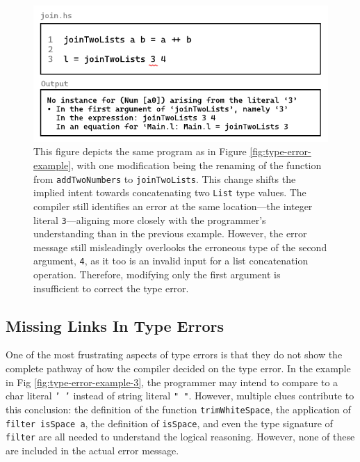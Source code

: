 \begin{figure}[hbt]
  \includegraphics[width=\linewidth]{TypeErrorExample2}
  \caption{
    \label{fig:type-error-example-2}
    This figure depicts the same program as in Figure \ref{fig:type-error-example}, with one modification being the renaming of the function from \texttt{addTwoNumbers} to \texttt{joinTwoLists}. This change shifts the implied intent towards concatenating two \texttt{List} type values. The compiler still identifies an error at the same location—the integer literal \texttt{3}—aligning more closely with the programmer's understanding than in the previous example. However, the error message still misleadingly overlooks the erroneous type of the second argument, \texttt{4}, as it too is an invalid input for a list concatenation operation. Therefore, modifying only the first argument is insufficient to correct the type error.
    }
\end{figure}

\subsection{Missing Links In Type Errors}
\label{subsec:missing-link}

One of the most frustrating aspects of type errors is that they do not show the complete pathway of how the compiler decided on the type error. In the example in Fig \ref{fig:type-error-example-3}, the programmer may intend to compare to a char literal \texttt{' '} instead of string literal \texttt{" "}. However, multiple clues contribute to this conclusion: the definition of the function \texttt{trimWhiteSpace}, the application of \texttt{filter isSpace a}, the definition of \texttt{isSpace}, and even the type signature of \texttt{filter} are all needed to understand the logical reasoning. However, none of these are included in the actual error message.


